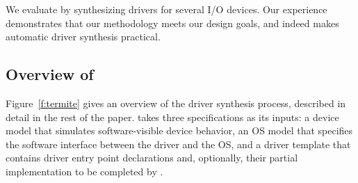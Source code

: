 %
%
%
%    
%
%

We evaluate \termite by synthesizing drivers for several I/O devices.  Our experience demonstrates that our methodology meets our design goals, and indeed makes automatic driver synthesis practical.

\subsection{Overview of \termite} Figure~\ref{f:termite} gives an overview of the driver synthesis process, described in detail in the rest of the paper.  \termite takes three specifications as its inputs: a device model that simulates software-visible device behavior, an OS model that specifies the software interface between the driver and the OS, and a driver template that contains driver entry point declarations and, optionally, their partial implementation to be completed by \termite.

